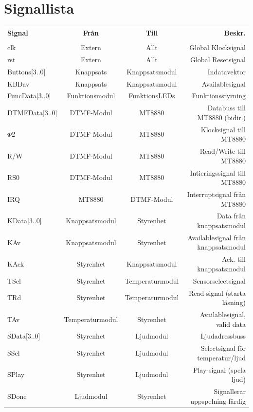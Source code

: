 \documentclass[a4paper,11pt]{article}
\begin{document}
	\section{Signallista}
	\begin{tabular}{l c c r}
		\\{\bf Signal} & {\bf Från} & {\bf Till} & {\bf Beskr.}\\ \\
		clk & Extern & Allt & Global Klocksignal\\
		rst & Extern & Allt & Global Resetsignal\\
		Buttons[3..0] & Knappsats & Knappsatsmodul & Indatavektor\\
		KBDav & Knappsats & Knappsatsmodul & Availablesignal\\
		FuncData[3..0] & Funktionsmodul & FunktionsLEDs & Funktionsstyrning\\
		DTMFData[3..0] & DTMF-Modul & MT8880 & Databuss till MT8880 (bidir.)\\
		\(\Phi\)2 & DTMF-Modul & MT8880 & Klocksignal till MT8880\\
		R/W & DTMF-Modul & MT8880 & Read/Write till MT8880\\
		RS0 & DTMF-Modul & MT8880 & Intieringssignal till MT8880\\
		IRQ & MT8880 & DTMF-Modul & Interruptsignal från MT8880\\

		KData[3..0] & Knappsatsmodul & Styrenhet & Data från knappsatsmodul\\
		KAv & Knappsatsmodul & Styrenhet & Availablesignal från knappsatsmodul\\
		KAck & Styrenhet & Knappsatsmodul & Ack. till knappsatsmodul\\

		TSel & Styrenhet & Temperaturmodul & Sensorselectsignal\\
		TRd & Styrenhet & Temperaturmodul & Read-signal (starta läsning)\\
		TAv & Temperaturmodul & Styrenhet & Availablesignal, valid data\\

		SData[3..0] & Styrenhet & Ljudmodul & Ljudadressbuss\\
		SSel & Styrenhet & Ljudmodul & Selectsignal för temperatur/ljud\\
		SPlay & Styrenhet & Ljudmodul & Play-signal (spela ljud)\\
		SDone & Ljudmodul & Styrenhet & Signallerar uppspelning färdig\\


\end{tabular}
\end{document}
